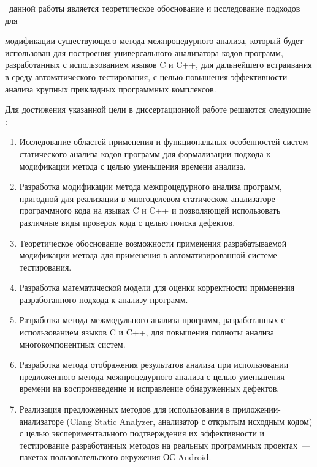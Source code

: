 \aim\ данной работы является теоретическое обоснование и исследование подходов для {модификации существующего метода межпроцедурного анализа, который будет использован для построения универсального анализатора кодов программ, разработанных с использованием языков C и C++, для дальнейшего встраивания в среду автоматического тестирования, с целью повышения эффективности анализа крупных прикладных программных комплексов. %

Для достижения указанной цели в диссертационной работе решаются следующие {\tasks}:
\begin{enumerate}
  \item Исследование областей применения и функциональных особенностей систем статического анализа кодов программ для формализации подхода к модификации метода с целью уменьшения времени анализа.
  \item Разработка модификации метода межпроцедурного анализа программ, пригодной для реализации в многоцелевом статическом анализаторе программного кода на языках C и C++ и позволяющей использовать различные виды проверок кода с целью поиска дефектов.
  \item Теоретическое обоснование возможности применения разрабатываемой модификации метода для применения в автоматизированной системе тестирования.
  \item Разработка математической модели для оценки корректности применения разработанного подхода к анализу программ.
  \item Разработка метода межмодульного анализа программ, разработанных с использованием языков C и C++, для повышения полноты анализа многокомпонентных систем.
  \item Разработка метода отображения результатов анализа при использовании предложенного метода межпроцедурного анализа с целью уменьшения времени на воспроизведение и исправление обнаруженных дефектов.
  \item Реализация предложенных методов для использования в приложении-анализаторе (Clang Static Analyzer, анализатор с открытым исходным кодом) с целью экспериментального подтверждения их эффективности и тестирование разработанных методов на реальных программных проектах~--- пакетах пользовательского окружения ОС Android.
\end{enumerate}

}
